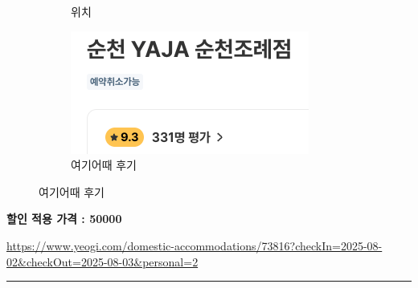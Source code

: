 \documentclass[10pt]{article}
\begin{document}
\begin{figure}[htbp]
\begin{subfigure}{0.3\textwidth}
    \caption{위치}
    \label{fig:2}
  \end{subfigure}
  \hfill
  \begin{subfigure}{0.3\textwidth}
    \centering
    \includegraphics[width=\linewidth]{fig/8_후기.png}
    \caption{여기어때 후기}
    \label{fig:3}
  \end{subfigure}
  \label{fig:three}
\end{figure}
\begin{center}
\textbf{할인 적용 가격 : 50000}
\end{center}
\url{https://www.yeogi.com/domestic-accommodations/73816?checkIn=2025-08-02&checkOut=2025-08-03&personal=2}
\bigskip      %
\hrule        %
\bigskip
\end{document}

